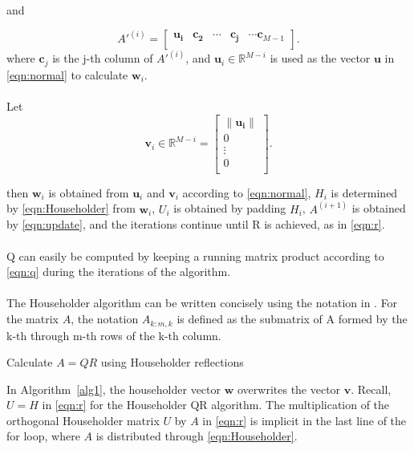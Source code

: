 \documentclass{article}
\begin{document}
and

\begin{equation}
A'^{(i)} =
\begin{bmatrix}
\mathbf{u_i} & \mathbf{c_2}  & \cdots & \mathbf{c_j} & \cdots \mathbf{c}_{M-1}\\
\end{bmatrix}.
\end{equation}
where $\mathbf{c}_j$ is the j-th column of $A'^{(i)}$, and $\mathbf{u}_i\in\mathbb{R}^{M-i}$ is used as the vector $\mathbf{u}$ in \eqref{eqn:normal} to calculate $\mathbf{w}_{i}$.
\paragraph{}
Let
\begin{equation}
\mathbf{v}_i\in\mathbb{R}^{M-i} = 
\begin{bmatrix}
\|\mathbf{u_i}\| \\
0  \\
\vdots \\
0 \\
\end{bmatrix}.
\end{equation}

then $\mathbf{w}_i$ is obtained from $\mathbf{u}_i$ and $\mathbf{v}_i$ according to \eqref{eqn:normal}, $H_i$ is determined by \eqref{eqn:Householder} from $\mathbf{w}_i$, $U_i$ is obtained by padding $H_i$, $A^{(i+1)}$ is obtained by \eqref{eqn:update}, and the iterations continue until R is achieved, as in \eqref{eqn:r}.

\paragraph{}
Q can easily be computed by keeping a running matrix product according to \eqref{eqn:q} during the iterations of the algorithm.

\paragraph{}
The Householder algorithm can be written concisely using the notation in \cite{}. For the matrix $A$, the notation $A_{k:m,k}$ is defined as the submatrix of A formed by the k-th through m-th rows of the k-th column. 


\begin{algorithm}
\caption{Calculate $A = QR$ using Householder reflections}
\label{alg1}
\begin{algorithmic}
\ENDFOR
\end{algorithmic}
\end{algorithm}
In Algorithm~\ref{alg1}, the householder vector $\mathbf{w}$ overwrites the vector $\mathbf{v}$. Recall, $U=H$ in \eqref{eqn:r} for the Householder QR algorithm. The multiplication of the orthogonal Householder matrix $U$ by $A$ in \eqref{eqn:r} is implicit in the last line of the for loop, where $A$ is distributed through \eqref{eqn:Householder}.
\end{document}
